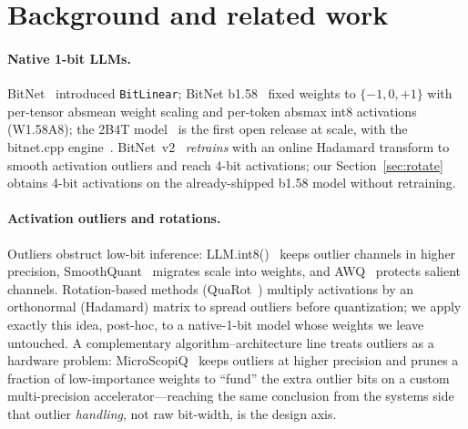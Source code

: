 \documentclass[11pt]{article}
\begin{document}
\section{Background and related work}
\paragraph{Native 1-bit LLMs.} BitNet~\cite{wang2023bitnet} introduced
\texttt{BitLinear}; BitNet b1.58~\cite{ma2024era} fixed weights to $\{-1,0,+1\}$ with
per-tensor absmean weight scaling and per-token absmax int8 activations (W1.58A8);
the 2B4T model~\cite{ma2024bitnet2b4t} is the first open release at scale, with the
bitnet.cpp engine~\cite{wang2025bitnetcpp}. BitNet~v2~\cite{wang2025bitnetv2}
\emph{retrains} with an online Hadamard transform to smooth activation outliers and
reach 4-bit activations; our Section~\ref{sec:rotate} obtains 4-bit activations on
the already-shipped b1.58 model without retraining.

\paragraph{Activation outliers and rotations.} Outliers obstruct low-bit inference:
LLM.int8()~\cite{dettmers2022llmint8} keeps outlier channels in higher precision,
SmoothQuant~\cite{xiao2023smoothquant} migrates scale into weights, and
AWQ~\cite{lin2023awq} protects salient channels. Rotation-based methods
(QuaRot~\cite{ashkboos2024quarot}) multiply activations by an orthonormal (Hadamard)
matrix to spread outliers before quantization; we apply exactly this idea, post-hoc,
to a native-1-bit model whose weights we leave untouched. A complementary
algorithm--architecture line treats outliers as a hardware problem:
MicroScopiQ~\cite{ramachandran2025microscopiq} keeps outliers at higher precision and
prunes a fraction of low-importance weights to ``fund'' the extra outlier bits on a
custom multi-precision accelerator---reaching the same conclusion from the systems
side that outlier \emph{handling}, not raw bit-width, is the design axis.
\end{document}
